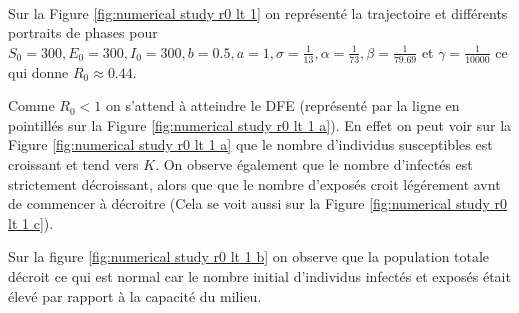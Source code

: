 \documentclass[11pt]{article}
\begin{document}
\paragraph{}
Sur la Figure \ref{fig:numerical study r0 lt 1} on repr\'esent\'e la trajectoire et diff\'erents portraits de phases pour $S_0 = 300, E_0 = 300, I_0 = 300, b =0.5, a = 1, \sigma = \frac{1}{13}, \alpha = \frac{1}{73}, \beta = \frac{1}{79.69}$ et $\gamma = \frac{1}{10000}$ ce qui donne $R_0 \approx 0.44$. 

Comme $R_0 < 1$ on s'attend \`a atteindre le DFE (repr\'esent\'e par la ligne en pointill\'es sur la Figure \ref{fig:numerical study r0 lt 1 a}). En effet on peut voir sur la Figure \ref{fig:numerical study r0 lt 1 a} que le nombre d'individus susceptibles est croissant et tend vers $K$. On observe \'egalement que le nombre d'infect\'es est strictement d\'ecroissant, alors que que le nombre d'expos\'es croit l\'eg\'erement avnt de commencer \`a d\'ecroitre (Cela se voit aussi sur la Figure \ref{fig:numerical study r0 lt 1 c}). 

Sur la figure \ref{fig:numerical study r0 lt 1 b} on observe que la population totale d\'ecroit ce qui est normal car le nombre initial  d'individus infect\'es et expos\'es \'etait \'elev\'e par rapport \`a la capacit\'e du milieu.
\end{document}
